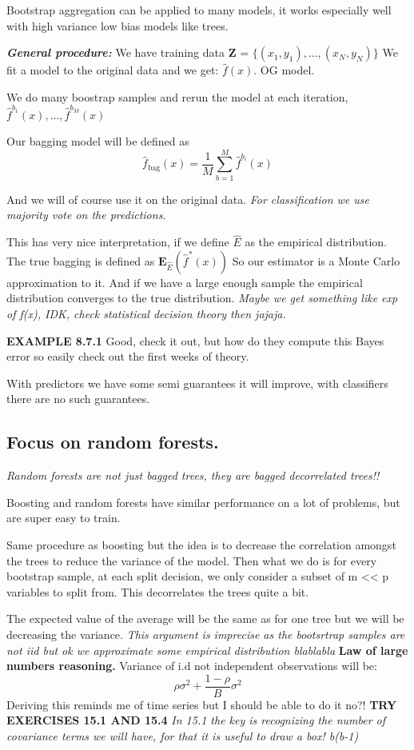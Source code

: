 \documentclass{article}
\begin{document}
Bootstrap aggregation can be applied to many models, it works especially well with high variance low bias models like trees.

\textbf{\textit{General procedure:}}
We have training data \textbf{Z} = $\{(x_1,y_1),...,(x_N, y_N) \}$
We fit a model to the original data and we get: $\hat{f}(x)$. OG model.

We do many boostrap samples and rerun the model at each iteration, $\hat{f}^{b_1}(x),...,\hat{f}^{b_M}(x)$

Our bagging model will be defined as $$\hat{f}_{\textrm{bag}}(x) = \frac{1}{M} \sum_{b=1}^M \hat{f}^{b_i}(x)$$

And we will of course use it on the original data. \textit{For classification we use majority vote on the predictions.}

This has very nice interpretation, if we define $\hat{E}$ as the empirical distribution.
The true bagging is defined as $\textbf{E}_{\hat{E}}(\hat{f}^*(x))$ So our estimator is a Monte Carlo approximation to it. And if we have a large enough sample the empirical distribution converges to the true distribution. \textit{Maybe we get something like exp of f(x), IDK, check statistical decision theory then jajaja. }

\textbf{EXAMPLE 8.7.1} Good, check it out, but how do they compute this Bayes error so easily check out the first weeks of theory.

With predictors we have some semi guarantees it will improve, with classifiers there are no such guarantees.

\subsection*{Focus on random forests.}
\textit{Random forests are not just bagged trees, they are bagged decorrelated trees!!}

Boosting and random forests have similar performance on a lot of problems, but are super easy to train.

Same procedure as boosting but the idea is to decrease the correlation amongst the trees to reduce the variance of the model.
Then what we do is for every bootstrap sample, at each split decision, we only consider a subset of m << p variables to split from. This decorrelates the trees quite a bit.

The expected value of the average will be the same as for one tree but we will be decreasing the variance. \textit{This argument is imprecise as the bootsrtrap samples are not iid but ok we approximate some empirical distribution blablabla} \textbf{Law of large numbers reasoning.}
Variance of i.d not independent observations will be:
$$\rho \sigma^2 + \frac{1-\rho}{B}\sigma^2$$
Deriving this reminds me of time series but I should be able to do it no?!
\textbf{TRY EXERCISES 15.1 AND 15.4}
\textit{In 15.1 the key is recognizing the number of covariance terms we will have, for that it is useful to draw a box! b(b-1)}
\end{document}
